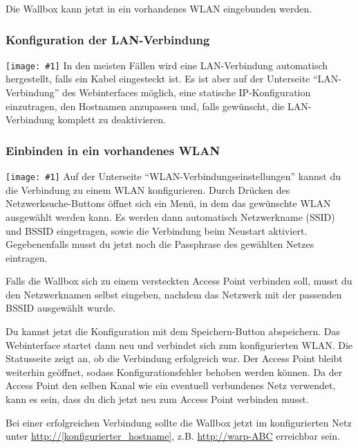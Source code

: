 \documentclass[a4paper,10pt]{article}
\newcommand{\gfx}[1]{\texttt{[image: \#1]}}
\begin{document}
\begin{multicols*}{2}
	Die Wallbox kann jetzt in ein vorhandenes WLAN eingebunden werden.


	\subsubsection{Konfiguration der LAN-Verbindung}
	\gfx{./img_warp2/resized/web_ethernet}
	In den meisten Fällen wird eine LAN-Verbindung automatisch hergestellt, falls ein Kabel eingesteckt ist.
	Es ist aber auf der Unterseite \enquote{LAN-Verbindung} des Webinterfaces möglich, eine statische IP-Konfiguration
	einzutragen, den Hostnamen anzupassen und, falls gewünscht, die LAN-Verbindung komplett zu deaktivieren.

	\subsubsection{Einbinden in ein vorhandenes WLAN}
	\gfx{./img_warp2/resized/web_wifi_sta}
	Auf der Unterseite \enquote{WLAN-Verbindungseinstellungen} kannst du die Verbindung zu einem WLAN konfigurieren.
	Durch Drücken des Netzwerksuche-Buttons öffnet sich ein Menü, in dem das gewünschte WLAN ausgewählt werden kann.
	Es werden dann automatisch Netzwerkname (SSID) und BSSID eingetragen, sowie die Verbindung beim Neustart aktiviert.
	Gegebenenfalls musst du jetzt noch die Passphrase des gewählten Netzes eintragen.

	Falls die Wallbox sich zu einem versteckten Access Point verbinden soll, musst du den Netzwerknamen selbst eingeben,
	nachdem das Netzwerk mit der passenden BSSID ausgewählt wurde.


	Du kannst jetzt die Konfiguration mit dem Speichern-Button abspeichern.
	Das Webinterface startet dann neu und verbindet sich zum konfigurierten WLAN. Die Statusseite zeigt
	an, ob die Verbindung erfolgreich war. Der Access Point bleibt weiterhin
	geöffnet, sodass Konfigurationsfehler behoben werden können.
	Da der Access Point den selben Kanal wie ein eventuell verbundenes Netz verwendet,
	kann es sein, dass du dich jetzt neu zum Access Point verbinden musst.

	Bei einer erfolgreichen Verbindung sollte die Wallbox jetzt im konfigurierten Netz unter
	\url{http://[konfigurierter_hostname]}, z.B. \url{http://warp-ABC} erreichbar sein.

	\newpage

\end{multicols*}
\end{document}

